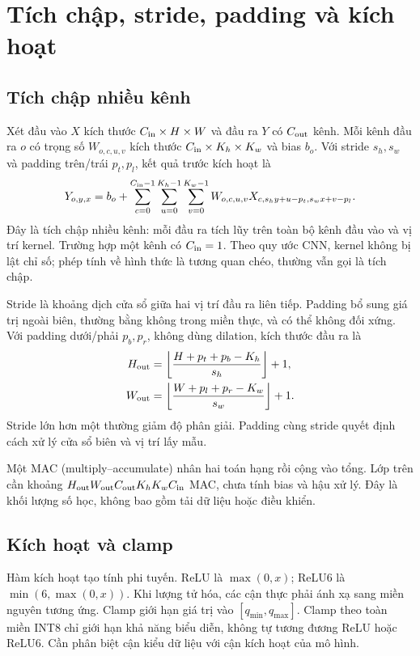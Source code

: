 \section{Tích chập, stride, padding và kích hoạt}
\subsection{Tích chập nhiều kênh}
Xét đầu vào $X$ kích thước $C_{\rm in}\times H\times W$ và đầu ra $Y$ có $C_{\rm out}$ kênh. Mỗi kênh đầu ra $o$ có trọng số $W_{o,c,u,v}$ kích thước $C_{\rm in}\times K_h\times K_w$ và bias $b_o$. Với stride $s_h,s_w$ và padding trên/trái $p_t,p_l$, kết quả trước kích hoạt là
\begin{equation}
 Y_{o,y,x}=b_o+\sum_{c=0}^{C_{\rm in}-1}\sum_{u=0}^{K_h-1}\sum_{v=0}^{K_w-1}
 W_{o,c,u,v}X_{c,s_hy+u-p_t,s_wx+v-p_l}.
\end{equation}
Đây là tích chập nhiều kênh: mỗi đầu ra tích lũy trên toàn bộ kênh đầu vào và vị trí kernel. Trường hợp một kênh có $C_{\rm in}=1$. Theo quy ước CNN, kernel không bị lật chỉ số; phép tính về hình thức là tương quan chéo, thường vẫn gọi là tích chập.

Stride là khoảng dịch cửa sổ giữa hai vị trí đầu ra liên tiếp. Padding bổ sung giá trị ngoài biên, thường bằng không trong miền thực, và có thể không đối xứng. Với padding dưới/phải $p_b,p_r$, không dùng dilation, kích thước đầu ra là
\begin{equation}
\begin{split}
 H_{\rm out}&=\left\lfloor\frac{H+p_t+p_b-K_h}{s_h}\right\rfloor+1,\\
 W_{\rm out}&=\left\lfloor\frac{W+p_l+p_r-K_w}{s_w}\right\rfloor+1.
\end{split}
\end{equation}
Stride lớn hơn một thường giảm độ phân giải. Padding cùng stride quyết định cách xử lý cửa sổ biên và vị trí lấy mẫu.

Một MAC (multiply--accumulate) nhân hai toán hạng rồi cộng vào tổng. Lớp trên cần khoảng $H_{\rm out}W_{\rm out}C_{\rm out}K_hK_wC_{\rm in}$ MAC, chưa tính bias và hậu xử lý. Đây là khối lượng số học, không bao gồm tải dữ liệu hoặc điều khiển.

\subsection{Kích hoạt và clamp}
Hàm kích hoạt tạo tính phi tuyến. ReLU là $\max(0,x)$; ReLU6 là $\min(6,\max(0,x))$. Khi lượng tử hóa, các cận thực phải ánh xạ sang miền nguyên tương ứng. Clamp giới hạn giá trị vào $[q_{\min},q_{\max}]$. Clamp theo toàn miền INT8 chỉ giới hạn khả năng biểu diễn, không tự tương đương ReLU hoặc ReLU6. Cần phân biệt cận kiểu dữ liệu với cận kích hoạt của mô hình.

